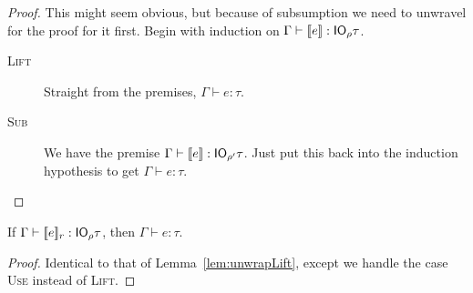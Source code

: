 \begin{proof}
  This might seem obvious, but because of subsumption we need to
  unwravel for the proof for it first. Begin with induction on $\Gamma \vdash
  \lift{e} : \IO_\rho \tau$.
  \begin{description}
  \item[\rm\textsc{Lift}] Straight from the premises, $\Gamma \vdash e : \tau$.
  \item[\rm\textsc{Sub}] We have the premise ${\Gamma \vdash \lift{e} : \IO_{\rho'}
    \tau}$. Just put this back into the induction hypothesis to get ${\Gamma \vdash e
    : \tau}$.
  \end{description}
\end{proof}

\begin{lemma}\label{lem:unwrapUse}
  If $\Gamma \vdash \use{r}{e} : \IO_\rho \tau$, then $\Gamma \vdash e : \tau$.
\end{lemma}
\begin{proof}
  Identical to that of Lemma~\ref{lem:unwrapLift}, except we handle
  the case \textsc{Use} instead of \textsc{Lift}.
\end{proof}

